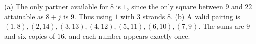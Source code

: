 (a) The only partner available for $8$ is $1$, since the only square between $9$ and $22$ attainable as $8+j$ is $9$. Thus using $1$ with $3$ strands $8$. (b) A valid pairing is $\boxed{(1,8),(2,14),(3,13),(4,12),(5,11),(6,10),(7,9)}$. The sums are $9$ and six copies of $16$, and each number appears exactly once.
